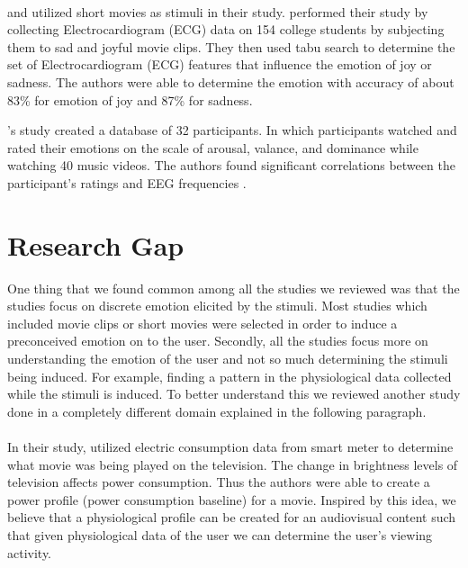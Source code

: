 \paragraph{} \citeauthor{w_wen_2014} \cite{w_wen_2014} \cite{wan_wen_2009} and \citeauthor{koelstra_deap:_2012} \cite{koelstra_deap:_2012} utilized short movies as stimuli in their study. \citeauthor{wan_wen_2009} performed their study by collecting Electrocardiogram (ECG) data on 154 college students by subjecting them to sad and joyful movie clips. They then used tabu search to determine the set of Electrocardiogram (ECG) features that influence the emotion of joy or sadness. The authors were able to determine the emotion with accuracy of about 83\% for emotion of joy and 87\% for sadness.

\citeauthor{koelstra_deap:_2012}'s study created a database of 32 participants. In which participants watched and rated their emotions on the scale of arousal, valance, and dominance while watching 40 music videos. The authors found significant correlations between the participant's ratings and EEG frequencies \cite{koelstra_deap:_2012}. 

\section{Research Gap} One thing that we found common among all the studies we reviewed was that the studies focus on discrete emotion elicited by the stimuli. Most studies which included movie clips or short movies were selected in order to induce a preconceived emotion on to the user. Secondly, all the studies focus more on understanding the emotion of the user and not so much determining the stimuli being induced. For example, finding a pattern in the physiological data collected while the stimuli is induced. To better understand this we reviewed another study done in a completely different domain explained in the following paragraph.

\paragraph{} In their study, \citeauthor{greveler_multimedia_nodate} \cite{greveler_multimedia_nodate} utilized electric consumption data from smart meter to determine what movie was being played on the television. The change in brightness levels of television affects power consumption. Thus the authors were able to create a power profile (power consumption baseline) for a movie. Inspired by this idea, we believe that a physiological profile can be created for an audiovisual content such that given physiological data of the user we can determine the user's viewing activity.

